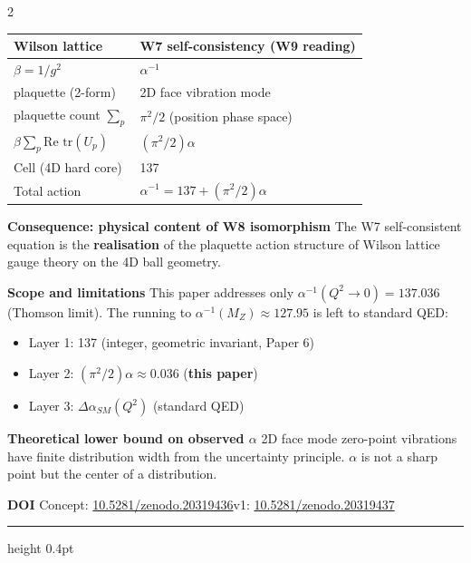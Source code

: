 \documentclass[9pt,a4paper]{article}
\begin{document}
\begin{multicols}{2}
\vspace{1pt}
{\footnotesize
\begin{tabular}{@{}ll@{}}
\toprule
Wilson lattice & W7 self-consistency (W9 reading) \\
\midrule
$\beta = 1/g^2$ & $\alpha^{-1}$ \\
plaquette (2-form) & 2D face vibration mode \\
plaquette count $\sum_p$ & $\pi^2/2$ (position phase space) \\
$\beta \sum_p \text{Re tr}(U_p)$ & $(\pi^2/2)\alpha$ \\
Cell (4D hard core) & 137 \\
Total action & $\alpha^{-1} = 137 + (\pi^2/2)\alpha$ \\
\bottomrule
\end{tabular}
}

\smallskip
\textbf{Consequence: physical content of W8 isomorphism}\enspace
The W7 self-consistent equation is the \textbf{realisation} of the plaquette action structure of Wilson lattice gauge theory on the 4D ball geometry.

\smallskip
\textbf{Scope and limitations}\enspace
This paper addresses only $\alpha^{-1}(Q^2 \to 0) = 137.036$ (Thomson limit). The running to $\alpha^{-1}(M_Z) \approx 127.95$ is left to standard QED:
\begin{itemize}[topsep=1pt]
\item Layer 1: 137 (integer, geometric invariant, Paper 6)
\item Layer 2: $(\pi^2/2)\alpha \approx 0.036$ (\textbf{this paper})
\item Layer 3: $\Delta\alpha_{SM}(Q^2)$ (standard QED)
\end{itemize}

\smallskip
\textbf{Theoretical lower bound on observed $\alpha$}\enspace
2D face mode zero-point vibrations have finite distribution width from the uncertainty principle. $\alpha$ is not a sharp point but the center of a distribution.

\smallskip
\textbf{DOI}\enspace
{\scriptsize Concept: \href{https://doi.org/10.5281/zenodo.20319436}{10.5281/zenodo.20319436}\enspace v1: \href{https://doi.org/10.5281/zenodo.20319437}{10.5281/zenodo.20319437}}

\end{multicols}

\vspace{2pt}
\hrule height 0.4pt
\vspace{3pt}
\end{document}

